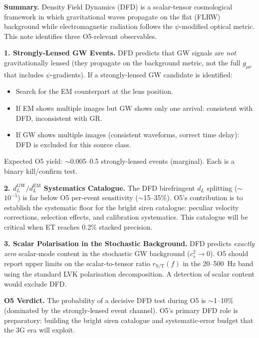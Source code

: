 \documentclass[11pt]{article}
\theoremstyle{definition}
\theoremstyle{remark}
\begin{document}
\begin{tcolorbox}[colback=white, colframe=black, title=\textbf{%
Density Field Dynamics: Predictions for LIGO/Virgo/KAGRA O5}]

\textbf{Summary.} Density Field Dynamics (DFD) is a scalar-tensor
cosmological framework in which gravitational waves propagate on the
flat (FLRW) background while electromagnetic radiation follows the
$\psi$-modified optical metric. This note identifies three O5-relevant
observables.

\medskip
\textbf{1. Strongly-Lensed GW Events.}
DFD predicts that GW signals are \emph{not} gravitationally lensed
(they propagate on the background metric, not the full $g_{\mu\nu}$
that includes $\psi$-gradients). If a strongly-lensed GW candidate is
identified:
\begin{itemize}[nosep]
\item Search for the EM counterpart at the lens position.
\item If EM shows multiple images but GW shows only one arrival:
  consistent with DFD, inconsistent with GR.
\item If GW shows multiple images (consistent waveforms, correct time
  delay): DFD is excluded for this source class.
\end{itemize}
Expected O5 yield: $\sim$0.005--0.5 strongly-lensed events (marginal).
Each is a binary kill/confirm test.

\medskip
\textbf{2. $d_L^{\mathrm{GW}}/d_L^{\mathrm{EM}}$ Systematics Catalogue.}
The DFD birefringent $d_L$ splitting ($\sim$$10^{-5}$) is far below O5
per-event sensitivity ($\sim$15--35\%). O5's contribution is to establish
the systematic floor for the bright siren catalogue: peculiar velocity
corrections, selection effects, and calibration systematics. This
catalogue will be critical when ET reaches 0.2\% stacked precision.

\medskip
\textbf{3. Scalar Polarisation in the Stochastic Background.}
DFD predicts \emph{exactly zero} scalar-mode content in the stochastic
GW background ($c_s^2 \to 0$). O5 should report upper limits on the
scalar-to-tensor ratio $r_{\mathrm{S/T}}(f)$ in the 20--500~Hz band
using the standard LVK polarisation decomposition. A detection of
scalar content would exclude DFD.

\medskip
\textbf{O5 Verdict.} The probability of a decisive DFD test during O5
is $\sim$1--10\% (dominated by the strongly-lensed event channel). O5's
primary DFD role is preparatory: building the bright siren catalogue and
systematic-error budget that the 3G era will exploit.

\end{tcolorbox}
\end{document}
